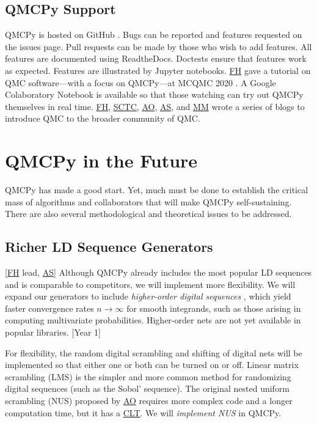 \documentclass[11pt]{NSFamsart}
\newcommand{\FH}{\hyperlink{FHlink}{FH}\xspace}
\newcommand{\SCTC}{\hyperlink{SCTClink}{SCTC}\xspace}
\newcommand{\AO}{\hyperlink{AOlink}{AO}\xspace}
\newcommand{\MM}{\hyperlink{MMlink}{MM}\xspace}
\newcommand{\AS}{\hyperlink{ASlink}{AS}\xspace}
\newcommand{\CLT}{\hyperlink{CLTlink}{CLT}\xspace}
\begin{document}
\subsection{QMCPy Support}
QMCPy is hosted on GitHub \cite{QMCPy2020a}. Bugs can be reported and features requested on the issues page.  Pull requests can be made by those who wish to add features.  All features are documented \cite{QMCPyDocs} using ReadtheDocs.  Doctests ensure that features work as expected. Features are illustrated by Jupyter notebooks.  \FH gave a tutorial on QMC software---with a focus on QMCPy---at MCQMC 2020 \cite{MCQMC2020QMCPyTut}.  A Google Colaboratory Notebook \cite{QMCPyTutColab2020} is available so that those watching  can try out QMCPy themselves in real time.  \FH, \SCTC, \AO, \AS, and \MM wrote a series of blogs \cite{QMCBlog} to introduce QMC to the broader community of QMC.

\section{QMCPy in the Future}
QMCPy has made a good start.  Yet, much must be done to establish the critical mass of algorithms and collaborators that will make QMCPy  self-sustaining.  There are also several methodological and theoretical issues to be addressed. 


\subsection{Richer LD Sequence Generators } [\FH lead, \AS] \label{sec:richLD}
Although QMCPy already includes the most popular LD sequences and is comparable to competitors, we will implement more flexibility.  We will expand our generators to include \emph{higher-order digital sequences} \cite{Dic09a, Dic11a}, which yield  faster convergence rates  $n \to \infty$ for smooth integrands, such as those arising in computing multivariate probabilities.  Higher-order nets are not yet available in popular libraries.  [Year 1]

For flexibility, the random digital scrambling and shifting of digital nets will be implemented so that either one or both can be turned on or off.  Linear matrix scrambling (LMS) \cite{Mat98,HonHic00a} is the simpler and more common method for randomizing digital sequences (such as the Sobol' sequence).  The original nested uniform scrambling (NUS) proposed by \AO \cite{Owe95} requires more complex code and a longer computation time, but it has a \CLT  \cite{Loh01}.  We will \emph{implement NUS} in QMCPy.
\end{document}
